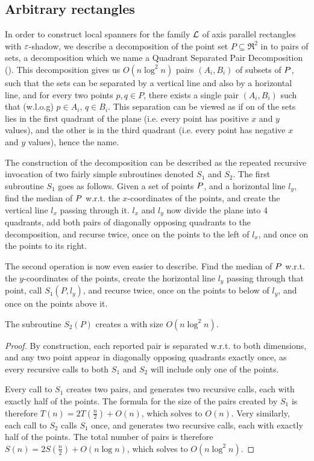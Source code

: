 \documentclass[12pt]{article}%
\begin{document}
\subsection{Arbitrary rectangles}

In order to construct local spanners for the family $\mathcal{L}$ of axis
parallel rectangles with $\varepsilon$-shadow, we describe a decomposition of
the point set $P\subseteq \Re^2$ in to pairs of sets, a decomposition
which we name a Quadrant Separated Pair Decomposition (\QSPD). This
decomposition gives us $O(n\log^2n)$ pairs $(A_i,B_i)$ of subsets of
$P$, such that the sets can be separated by a vertical line and also
by a horizontal line, and for every two points $p,q\in P$, there
exists a single pair $(A_i,B_i)$ such that (w.l.o.g) $p\in A_i$,
$q\in B_i$. This separation can be viewed as if on of the sets lies in
the first quadrant of the plane (i.e. every point has positive $x$ and
$y$ values), and the other is in the third quadrant (i.e. every point
has negative $x$ and $y$ values), hence the name.

The construction of the decomposition can be described as the repeated
recursive invocation of two fairly simple subroutines denoted $S_1$
and $S_2$. The first subroutine $S_1$ goes as follows. Given a set of
points $P$, and a horizontal line $l_y$, find the median of $P$
w.r.t. the $x$-coordinates of the points, and create the vertical line
$l_x$ passing through it. $l_x$ and $l_y$ now divide the plane into 4
quadrants, add both pairs of diagonally opposing quadrants to the
decomposition, and recurse twice, once on the points to the left of
$l_x$, and once on the points to its right.

The second operation is now even easier to describe. Find the median
of $P$ w.r.t. the $y$-coordinates of the points, create the
horizontal line $l_y$ passing through that point, call $S_1(P,l_y)$,
and recurse twice, once on the points to below of $l_y$, and once on
the points above it.

\begin{claim}
    The subroutine $S_2(P)$ creates a \QSPD with size $O(n\log^2n)$.
\end{claim}

\begin{proof}
    By construction, each reported pair is separated w.r.t. to both
    dimensions, and any two point appear in diagonally opposing
    quadrants exactly once, as every recursive calls to both $S_1$ and
    $S_2$ will include only one of the points.
    
    Every call to $S_1$ creates two pairs, and generates two recursive
    calls, each with exactly half of the points. The formula for the
    size of the pairs created by $S_1$ is therefore
    $T(n)=2T\left( \frac{n}{2}\right) + O(n)$, which solves to
    $O(n)$. Very similarly, each call to $S_2$ calls $S_1$ once, and
    generates two recursive calls, each with exactly half of the
    points. The total number of pairs is therefore
    $S(n)=2S\left( \frac{n}{2}\right) + O(n\log n)$, which solves to
    $O(n\log^2n)$.
    
\end{proof}
\end{document}
